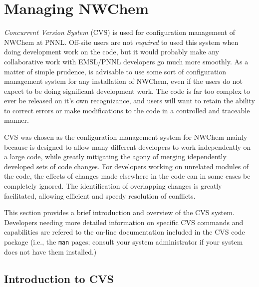 \section{Managing NWChem}
\label{sec:cvs-intro}

{\it Concurrent Version System} (CVS) is used for configuration management of
NWChem at PNNL.  Off-site users are not {\em required} to used this system when 
doing development work on the code, but it would probably make any collaborative
work with EMSL/PNNL developers go much more smoothly.  As a matter of simple
prudence, is advisable to use some sort
of configuration management system for any installation of NWChem, even if
the users do not expect to be doing significant development work.  The code
is far too complex to ever be released on it's own recognizance, and users
will want to retain the ability to correct errors or make modifications to the
code in a controlled and traceable manner.  

CVS was chosen as the configuration management system for NWChem mainly
because is designed to allow many different developers to work independently
on a large code, while greatly mitigating the agony of merging idependently
developed sets of code changes.  For developers working on unrelated modules
of the code, the effects of changes made elsewhere in the code can in some cases
be completely ignored.  The identification of overlapping changes is greatly
facilitated, allowing efficient and speedy resolution of conflicts.

This section provides a brief introduction and overview of the CVS system.
Developers needing more detailed information on specific CVS commands and
capabilities are refered to the on-line documentation included in the CVS 
code package (i.e., the \verb+man+ pages; consult your system administrator
if your system does not have them installed.)

\subsection{Introduction to CVS}


